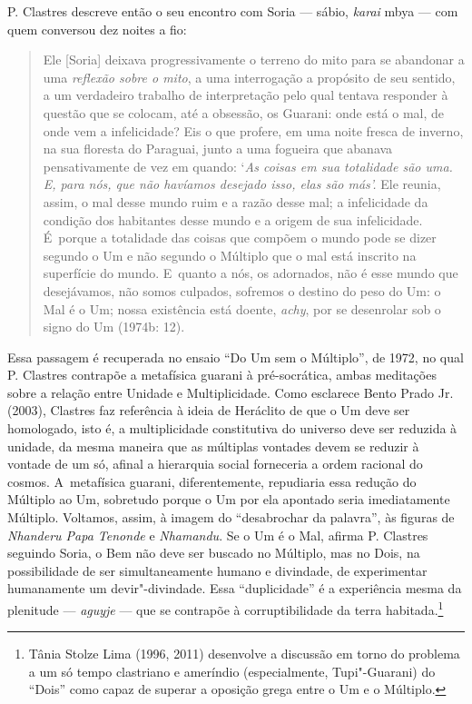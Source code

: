 P. Clastres descreve então o seu encontro com Soria --- sábio, \emph{karai} mbya
--- com quem conversou dez noites a fio:

\begin{quote}
Ele [Soria] deixava progressivamente o terreno do mito para se
abandonar a uma \emph{reflexão sobre o mito}, a uma interrogação a
propósito de seu sentido, a um verdadeiro trabalho de interpretação pelo
qual tentava responder à questão que se colocam, até a obsessão, os
Guarani: onde está o mal, de onde vem a infelicidade? Eis o que profere,
em uma noite fresca de inverno, na sua floresta do Paraguai, junto a uma
fogueira que abanava pensativamente de vez em quando: `\emph{As coisas
em sua totalidade são uma. E, para nós, que não havíamos desejado isso,
elas são más'.} Ele reunia, assim, o mal desse mundo ruim e a razão
desse mal; a infelicidade da condição dos habitantes desse mundo e a
origem de sua infelicidade. É~porque a totalidade das coisas que compõem
o mundo pode se dizer segundo o Um e não segundo o Múltiplo que o mal
está inscrito na superfície do mundo. E~quanto a nós, os adornados, não
é esse mundo que desejávamos, não somos culpados, sofremos o destino do
peso do Um: o Mal é o Um; nossa existência está doente, \emph{achy}, por se
desenrolar sob o signo do Um (1974b: 12).
\end{quote}

Essa passagem é recuperada no ensaio ``Do Um sem o Múltiplo'', de 1972, no
qual P. Clastres contrapõe a metafísica guarani à pré-socrática, ambas
meditações sobre a relação entre Unidade e Multiplicidade. Como
esclarece Bento Prado Jr. (2003), Clastres faz referência à ideia de
Heráclito de que o Um deve ser homologado, isto é, a multiplicidade
constitutiva do universo deve ser reduzida à unidade, da mesma maneira
que as múltiplas vontades devem se reduzir à vontade de um só, afinal a
hierarquia social forneceria a ordem racional do cosmos. A~metafísica
guarani, diferentemente, repudiaria essa redução do Múltiplo ao Um,
sobretudo porque o Um por ela apontado seria imediatamente Múltiplo.
Voltamos, assim, à imagem do ``desabrochar da palavra'', às figuras de
\emph{Nhanderu Papa Tenonde} e \emph{Nhamandu}. Se o Um é o Mal, afirma P. Clastres
seguindo Soria, o Bem não deve ser buscado no Múltiplo, mas no Dois, na
possibilidade de ser simultaneamente humano e divindade, de
experimentar humanamente um devir"-divindade. Essa ``duplicidade'' é a
experiência mesma da plenitude --- \emph{aguyje} --- que se contrapõe à
corruptibilidade da terra habitada.\footnote{Tânia Stolze Lima (1996,
2011) desenvolve a discussão em torno do problema a um só tempo
clastriano e ameríndio (especialmente, Tupi"-Guarani) do ``Dois'' como
capaz de superar a oposição grega entre o Um e o Múltiplo.}

